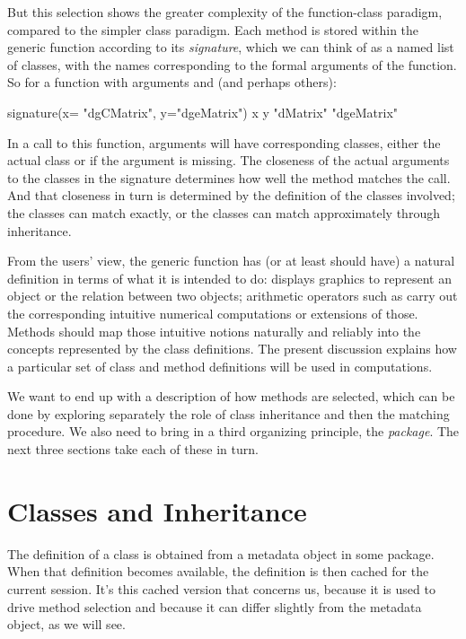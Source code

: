 \documentclass[11pt]{article}
\begin{document}
But  this selection shows  the greater complexity of the function-class paradigm, compared to the simpler class paradigm.
Each method is stored within the generic function according to its \emph{signature},  which we can think of as a named list of classes, with the names corresponding to the formal arguments of the function.  So for a function with arguments  and  (and perhaps others):
\begin{Example}
\SPrompt{}signature(x= "dgCMatrix", y="dgeMatrix")
          x           y 
"dMatrix" "dgeMatrix" 
\end{Example}
In a call to this function, arguments will have corresponding classes, either the actual class or  if the argument is missing.
The closeness of the actual arguments to the  classes in the signature  determines how well the method matches the call.
And that closeness in turn is determined by the definition of the classes involved; the classes can match exactly, or the classes can match approximately through inheritance.

From the users' view, the generic function has (or at least should have) a natural definition in terms of what it is intended to do:   displays graphics to represent an object or the relation between two objects; arithmetic operators such as \SOperator{+} carry out the corresponding intuitive numerical computations or extensions of those.
Methods should map those intuitive notions naturally and reliably into the concepts represented by the class definitions.
The present discussion explains how a particular set of class and method definitions will be used in computations.


We want to end up with a description of how methods are selected, which can be done by exploring separately the role of class inheritance and then the matching procedure.
We also need to bring in a third organizing principle, the \R{} \emph{package}.
The next three sections take each of these in turn.

\section{Classes and Inheritance}
\label{sec:class-defin-inher}

The definition of a class is obtained from a metadata object in some \R{} package.
When that definition becomes available, the definition is then cached for the current \R{} session.
It's this cached version that concerns us, because it is used to drive method selection and because it can differ slightly from the metadata object, as we will see.
\end{document}
